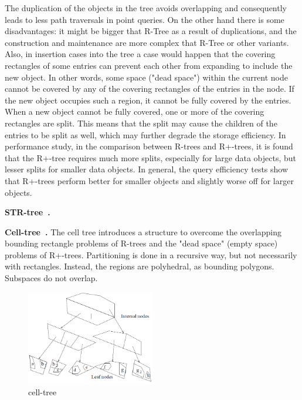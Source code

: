 \documentclass[a4paper,12pt]{article}
\begin{document}
The duplication of the objects in the tree avoids overlapping and consequently leads to less path traversals in point queries. 
On the other hand there is some disadvantages: it might be bigger that R-Tree as a result of duplications, and the construction and maintenance are more complex that R-Tree or other variants. 
Also, in insertion cases into the tree a case would happen that the covering rectangles of some entries can prevent each other from expanding to include the new object. In other words, some space ("dead space") within the current node cannot be covered by any of the covering rectangles of the entries in the node. If the new object occupies such a region, it cannot be fully covered by the entries. When a new object cannot be fully covered, one or more of the covering rectangles are split. This means that the split may cause the children of the entries to be split as well, which may further degrade the storage efficiency.
In performance study, in the comparison between R-trees and R+-trees, it is found that the R+-tree requires much more splits, especially for large data objects, but lesser splits for smaller data objects. 
In general, the query efficiency tests show that R+-trees perform better for smaller objects and slightly worse off for larger objects.

\textbf{STR-tree~\cite{strtree}.}

\textbf{Cell-tree~\cite{celltree}.}
The cell tree introduces a structure to overcome the overlapping bounding rectangle problems of R-trees and the "dead space" (empty space) problems of R+-trees. Partitioning is done in a recursive way, but not necessarily with rectangles. Instead, the regions are polyhedral, as bounding polygons. Subspaces do not overlap.  
\begin{figure}
\centering
\includegraphics[width=0.5\textwidth]{celltree}
\caption{cell-tree}
\label{figcelltree}
\end{figure}
\end{document}
